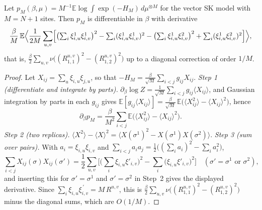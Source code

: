 \begin{theorem}\label{thm:sg-tal:vector-free-energy-derivative}
\leanok
{}
Let $p_M(\beta,\mu)=M^{-1}\mathbb E\log\int\exp(-H_M)\,d\mu^{\otimes M}$ for the vector SK model with $M=N+1$ sites. Then $p_M$ is differentiable in $\beta$ with derivative
\[
\frac{\beta}{M}\,\mathbb E\Bigl\langle\frac1{2M}\sum_{u,v}\Bigl[\bigl(\textstyle\sum_{i}\xi^1_{i,u}\xi^1_{i,v}\bigr)^2-\sum_i(\xi^1_{i,u}\xi^1_{i,v})^2-\bigl(\textstyle\sum_i\xi^1_{i,u}\xi^2_{i,v}\bigr)^2+\sum_i(\xi^1_{i,u}\xi^2_{i,v})^2\Bigr]\Bigr\rangle,
\]
that is, $\frac\beta2\sum_{u,v}\nu\bigl((R^{u,v}_{1,1})^2-(R^{u,v}_{1,2})^2\bigr)$ up to a diagonal correction of order $1/M$.
\end{theorem}
\begin{proof}
\leanok
Let $X_{ij}=\sum_u\xi_{i,u}\xi_{j,u}$, so that $-H_M=\frac\beta{\sqrt M}\sum_{i<j}g_{ij}X_{ij}$.
\emph{Step 1 (differentiate and integrate by parts).} $\partial_\beta\log Z=\frac1{\sqrt M}\sum_{i<j}g_{ij}\langle X_{ij}\rangle$, and Gaussian integration by parts in each $g_{ij}$ gives $\mathbb E[g_{ij}\langle X_{ij}\rangle]=\frac\beta{\sqrt M}\,\mathbb E\big(\langle X_{ij}^2\rangle-\langle X_{ij}\rangle^2\big)$, hence
\[
\partial_\beta p_M=\frac\beta{M^2}\sum_{i<j}\mathbb E\Big(\langle X_{ij}^2\rangle-\langle X_{ij}\rangle^2\Big).
\]
\emph{Step 2 (two replicas).} $\langle X^2\rangle-\langle X\rangle^2=\big\langle X(\sigma^1)^2-X(\sigma^1)X(\sigma^2)\big\rangle$.
\emph{Step 3 (sum over pairs).} With $a_i=\xi_{i,u}\xi_{i,v}$ and $\sum_{i<j}a_ia_j=\frac12\big((\sum_ia_i)^2-\sum_ia_i^2\big)$,
\[
\sum_{i<j}X_{ij}(\sigma)X_{ij}(\sigma')=\frac12\sum_{u,v}\Big[\Big(\sum_i\xi_{i,u}\xi'_{i,v}\Big)^2-\sum_i\big(\xi_{i,u}\xi'_{i,v}\big)^2\Big]\quad(\sigma'=\sigma^1\text{ or }\sigma^2),
\]
and inserting this for $\sigma'=\sigma^1$ and $\sigma'=\sigma^2$ in Step~2 gives the displayed derivative. Since $\sum_i\xi_{i,u}\xi_{i,v}^{\,\prime}=M\,R^{u,v}$, this is $\frac\beta2\sum_{u,v}\nu\big((R^{u,v}_{1,1})^2-(R^{u,v}_{1,2})^2\big)$ minus the diagonal sums, which are $O(1/M)$.
\end{proof}

